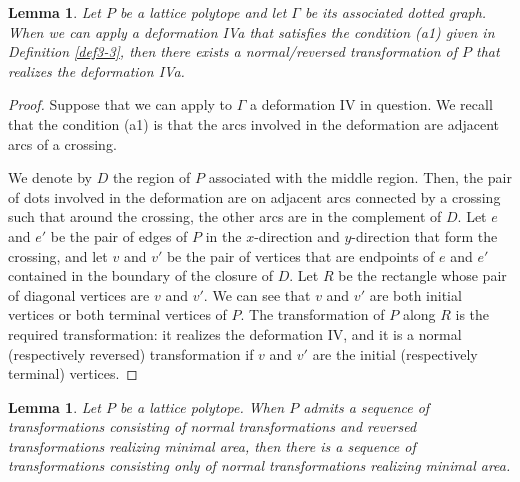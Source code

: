 \documentclass[a4paper,11pt]{amsart}
\numberwithin{equation}{section}
\newtheorem{lemma}[theorem]{Lemma}
\begin{document}
\begin{lemma}\label{lem-822}
Let $P$ be a lattice polytope and 
let $\Gamma$ be its associated dotted graph. 
When we can apply a deformation IVa that satisfies the condition (a1) given in Definition \ref{def3-3}, then 
there exists a normal/reversed transformation of $P$ that realizes the deformation IVa. 
\end{lemma}

\begin{proof}
Suppose that we can apply to $\Gamma$ a deformation IV in question. We recall that the condition (a1) is that the arcs involved in the deformation are adjacent arcs of a crossing. 


We denote by $D$ the region of $P$ associated with the middle region. 
Then, the pair of dots involved in the deformation are on adjacent arcs connected by a crossing such that around the crossing, the other arcs are in the complement of $D$. Let $e$ and $e'$ be the pair of edges of $P$ in the $x$-direction and $y$-direction that form the crossing, and let $v$ and $v'$ be the pair of vertices that are endpoints of $e$ and $e'$ contained in the boundary of the closure of $D$. Let $R$ be the rectangle whose pair of diagonal vertices are $v$ and $v'$. We can see that $v$ and $v'$ are both initial vertices or both terminal vertices of $P$. The transformation of $P$ along $R$ is the required transformation: it realizes the deformation IV, and it is a normal (respectively reversed) transformation if $v$ and $v'$ are the initial (respectively terminal) vertices. 
\end{proof}


\begin{lemma}\label{lem-821}
Let $P$ be a lattice polytope. 
When $P$ admits a sequence of  transformations consisting of normal transformations and reversed transformations realizing minimal area, 
then there is a sequence of  transformations consisting only of normal transformations realizing minimal area. 
\end{lemma}
\end{document}
